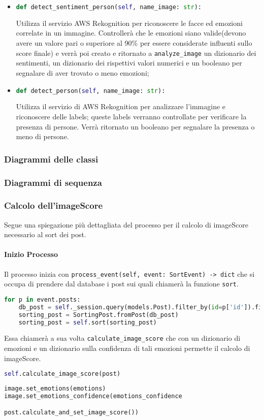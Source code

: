\begin{itemize}
	\item 
	\begin{lstlisting}[language=Python, numbers=none]
def detect_sentiment_person(self, name_image: str):
	\end{lstlisting}	
Utilizza il servizio AWS Rekognition per riconoscere le facce ed emozioni correlate in un immagine. Controllerà che le emozioni siano valide(devono avere un valore pari o superiore al 90\% per essere considerate influenti sullo score finale) e verrà poi creato e ritornato a \verb+analyze_image+ un dizionario dei sentimenti, un dizionario dei rispettivi valori numerici e un booleano per segnalare di aver trovato o meno emozioni;
	\item
	\begin{lstlisting}[language=Python, numbers=none]	
def detect_person(self, name_image: str):
	\end{lstlisting}	
Utilizza il servizio di AWS Rekognition per analizzare l'immagine e riconoscere delle labels; queste labels verranno controllate per verificare la presenza di persone. Verrà ritornato un booleano per segnalare la presenza o meno di persone.
\end{itemize}
\subsubsection{Diagrammi delle classi}
\subsubsection{Diagrammi di sequenza}
\subsubsection{Calcolo dell'imageScore}
Segue una spiegazione più dettagliata del processo per il calcolo di imageScore necessario al sort dei post.
\paragraph{Inizio Processo} \aCapo{}
Il processo inizia con \verb+process_event(self, event: SortEvent) -> dict+ che si occupa di prendere dal database i post sui quali chiamerà la funzione \verb+sort+.
\begin{lstlisting}[language=Python]
for p in event.posts:
    db_post = self._session.query(models.Post).filter_by(id=p['id']).first()
    sorting_post = SortingPost.fromPost(db_post)
    sorting_post = self.sort(sorting_post)
\end{lstlisting} 
Essa chiamerà a sua volta \verb+calculate_image_score+ che con un dizionario di emozioni e un dizionario sulla confidenza di tali emozioni permette il calcolo di imageScore.
\begin{lstlisting}[language=Python]
self.calculate_image_score(post)
\end{lstlisting}
\begin{lstlisting}[language=Python]
image.set_emotions(emotions)
image.set_emotions_confidence(emotions_confidence

post.calculate_and_set_image_score())
\end{lstlisting} 
